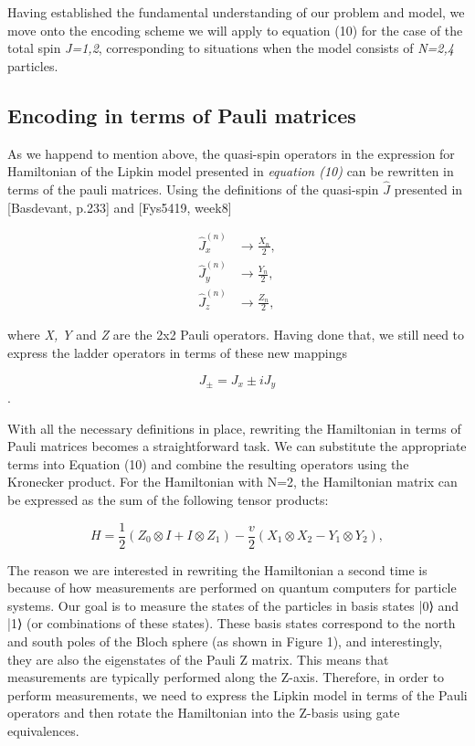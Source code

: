 \documentclass[onecolumn,10pt,cleanfoot]{asme2ej}
\begin{document}
Having established the fundamental understanding of our problem and model, we move onto the encoding scheme we will apply to equation (10) for the case of the total spin \textit{J=1,2}, corresponding to situations when the model consists of \textit{N=2,4} particles.

\subsection{Encoding in terms of Pauli matrices}
As we happend to mention above, the quasi-spin operators in the expression for Hamiltonian of the Lipkin model presented in \textit{equation (10)} can be rewritten in terms of the pauli matrices. Using the definitions of the quasi-spin $\hat{J}$ presented in [Basdevant, p.233] and [Fys5419, week8] 

\begin{equation}
\begin{aligned}
	\hat{J}_x^{(n)} &\rightarrow \frac{X_n}{2}, \\
	\hat{J}_y^{(n)} &\rightarrow \frac{Y_n}{2}, \\
	\hat{J}_z^{(n)} &\rightarrow \frac{Z_n}{2}, 
\end{aligned}
\end{equation}

where \textit{X, Y} and \textit{Z} are the 2x2 Pauli operators. Having done that, we still need to express the ladder operators in terms of these new mappings

\begin{equation}
J_{\pm} = J_x \pm iJ_y
\end{equation}. 

With all the necessary definitions in place, rewriting the Hamiltonian in terms of Pauli matrices becomes a straightforward task. We can substitute the appropriate terms into Equation (10) and combine the resulting operators using the Kronecker product. For the Hamiltonian with N=2, the Hamiltonian matrix can be expressed as the sum of the following tensor products:

\begin{equation}
H = \frac{1}{2} (Z_0 \otimes I + I \otimes Z_1) - \frac{v}{2} (X_1 \otimes X_2 - Y_1 \otimes Y_2), 
\end{equation}


The reason we are interested in rewriting the Hamiltonian a second time is because of how measurements are performed on quantum computers for particle systems. Our goal is to measure the states of the particles in basis states |0⟩ and |1⟩ (or combinations of these states). These basis states correspond to the north and south poles of the Bloch sphere (as shown in Figure 1), and interestingly, they are also the eigenstates of the Pauli Z matrix. This means that measurements are typically performed along the Z-axis. Therefore, in order to perform measurements, we need to express the Lipkin model in terms of the Pauli operators and then rotate the Hamiltonian into the Z-basis using gate equivalences.
\end{document}
